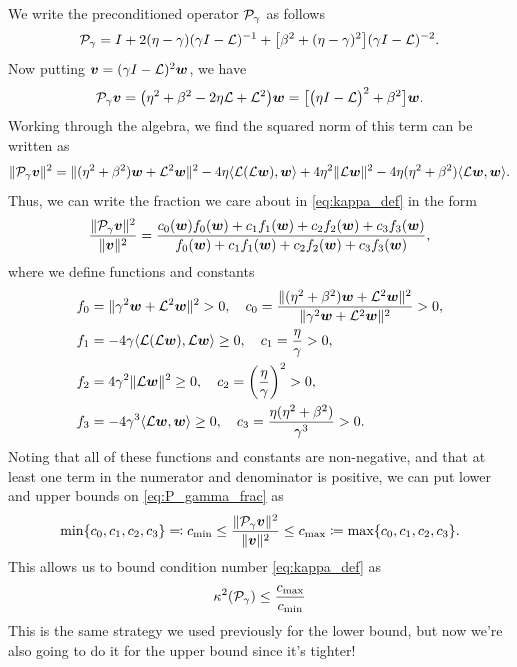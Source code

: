 \documentclass[a4paper,10pt]{article}
\begin{document}
We write the preconditioned operator ${\cal P}_{\gamma}$ as follows
\begin{align*}
{\cal P}_{\gamma} = I + 2(\eta - \gamma) (\gamma I - {\cal L})^{-1} + \big[ \beta^2 + (\eta - \gamma)^2 \big] (\gamma I - {\cal L})^{-2}.
\end{align*}
Now putting $\bm{v} = (\gamma I - {\cal L})^{2} \bm{w}$, we have
\begin{align*}
{\cal P}_{\gamma} \bm{v} = \big( \eta^2 + \beta^2 - 2\eta{\cal L} + {\cal L}^2 \big) \bm{w} = \big[ \big( \eta I - {\cal L} \big)^2 +  \beta^2 \big] \bm{w}.
\end{align*}
Working through the algebra, we find the squared norm of this term can be written as
\begin{align*}
\Vert {\cal P}_{\gamma} \bm{v} \Vert^2
=
\Vert (\eta^2 + \beta^2) \bm{w} + {\cal L}^2 \bm{w} \Vert^2  - 4 \eta \langle {\cal L}({\cal L} \bm{w}), \bm{w} \rangle + 4 \eta^2 \Vert {\cal L} \bm{w} \Vert^2 - 4 \eta (\eta^2 +\beta^2) \langle {\cal L} \bm{w}, \bm{w} \rangle.
\end{align*}
Thus, we can write the fraction we care about in \eqref{eq:kappa_def} in the form
\begin{align}
\label{eq:P_gamma_frac}
\frac{\Vert {\cal P}_{\gamma} \bm{v} \Vert^2}{\Vert \bm{v} \Vert^2}
=
\frac{
c_0(\bm{w}) f_0(\bm{w}) + c_1 f_1(\bm{w}) + c_2 f_2(\bm{w}) + c_3 f_3(\bm{w})
}
{
f_0(\bm{w}) + c_1 f_1(\bm{w}) + c_2 f_2(\bm{w}) + c_3 f_3(\bm{w})
},
\end{align}
where we define functions and constants
\begin{align*}
f_0 &= \Vert \gamma^2 \bm{w} + {\cal L}^2 \bm{w} \Vert^2 > 0,
\quad
c_0 = \frac{\Vert (\eta^2 + \beta^2) \bm{w} + {\cal L}^2 \bm{w} \Vert^2}{\Vert \gamma^2 \bm{w} + {\cal L}^2 \bm{w} \Vert^2} > 0,
\\
f_1 &= -4 \gamma \langle {\cal L}({\cal L} \bm{w}), {\cal L} \bm{w} \rangle \geq 0,
\quad 
c_1 = \frac{\eta}{\gamma} > 0,\\
f_2 &= 4 \gamma^2 \Vert {\cal L} \bm{w} \Vert^2 \geq 0, 
\quad
c_2 = \left( \frac{\eta}{\gamma} \right)^2 > 0, \\
f_3 &= -4 \gamma^3 \langle {\cal L} \bm{w}, \bm{w} \rangle \geq 0, 
\quad
c_3 = \frac{\eta (\eta^2 + \beta^2)}{\gamma^3} > 0.
\end{align*}
Noting that all of these functions and constants are non-negative, and that at least one term in the numerator and denominator is positive, we can put lower and upper bounds on \eqref{eq:P_gamma_frac} as
\begin{align}
\min \{ c_0, c_1, c_2, c_3 \} \eqqcolon c_{\min}
\leq
\frac{\Vert {\cal P}_{\gamma} \bm{v} \Vert^2}{\Vert \bm{v} \Vert^2} 
\leq c_{\max} 
\coloneqq \max \{ c_0, c_1, c_2, c_3 \}.
\end{align}
This allows us to bound condition number \eqref{eq:kappa_def} as
\begin{align} \label{eq:kappa_sq_bound}
\kappa^2({\cal P}_{\gamma}) \leq \frac{c_{\max}}{c_{\min}}
\end{align}
This is the same strategy we used previously for the lower bound, but now we're also going to do it for the upper bound since it's tighter!\\
\end{document}
